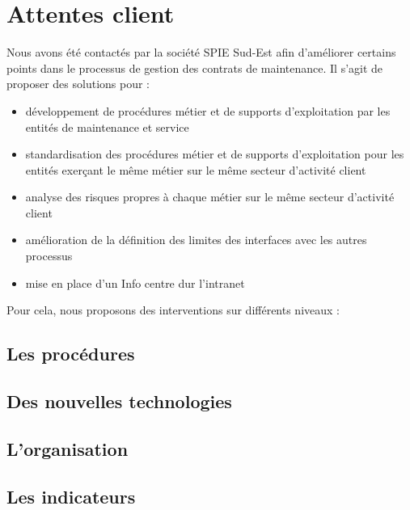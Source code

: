 \chapter{Attentes client}
	Nous avons été contactés par la société SPIE Sud-Est afin d'améliorer certains points dans le processus de gestion des contrats de maintenance. Il s'agit de proposer des solutions pour : 

	\begin{itemize}
        \item développement de procédures métier et de supports d'exploitation par les entités de maintenance et service
        \item standardisation des procédures métier et de supports d'exploitation pour les entités exerçant le même métier sur le même secteur d'activité client
        \item analyse des risques propres à chaque métier sur le même secteur d'activité client
        \item amélioration de la définition des limites des interfaces avec les autres processus
        \item mise en place d'un Info centre dur l'intranet
    \end{itemize}

    Pour cela, nous proposons des interventions sur différents niveaux : 

    \section{Les procédures}

    \section{Des nouvelles technologies}

    \section{L'organisation}

    \section{Les indicateurs}